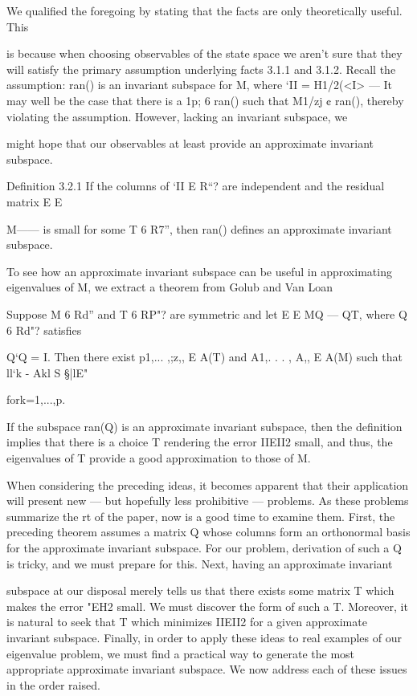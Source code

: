 We qualiﬁed the foregoing by stating that the facts are only theoretically useful. This

is because when choosing observables of the state space we aren't sure that they will satisfy the
primary assumption underlying facts 3.1.1 and 3.1.2. Recall the assumption: ran(\II) is an invariant
subspace for M, where ‘II = H1/2(<I> —  It may well be the case that there is a 1p; 6 ran(\II) such
that M1/zj ¢ ran(\II), thereby violating the assumption. However, lacking an invariant subspace, we

might hope that our observables at least provide an approximate invariant subspace.

Deﬁnition 3.2.1 If the columns of ‘II E R“? are independent and the residual matrix E E

M\II —— \IIT is small for some T 6 R7”, then ran(\II) deﬁnes an approximate invariant subspace.

To see how an approximate invariant subspace can be useful in approximating eigenvalues of M,
we extract a theorem from Golub and Van Loan 
\begin{theorem}
\label{thm-3.2.1}  
Suppose M 6 Rd” and T 6 RP"? are symmetric and let E E MQ — QT, where Q 6 Rd"? satisﬁes

Q‘Q = I. Then there exist p1,... ,;z,, E A(T) and A1,. . . , A,, E A(M) such that
ll‘k - Akl S \/§|lE"

fork=1,...,p.
\end{theorem}

If the subspace ran(Q) is an approximate invariant subspace, then the deﬁnition implies that
there is a choice T rendering the error IIEII2 small, and thus, the eigenvalues of T provide a good
approximation to those of M.

When considering the preceding ideas, it becomes apparent that their application will
present new — but hopefully less prohibitive — problems. As these problems summarize the rt of
the paper, now is a good time to examine them. First, the preceding theorem assumes a matrix Q
whose columns form an orthonormal basis for the approximate invariant subspace. For our problem,
derivation of such a Q is tricky, and we must prepare for this. Next, having an approximate invariant

subspace at our disposal merely tells us that there exists some matrix T which makes the error
"EH2 small. We must discover the form of such a T. Moreover, it is natural to seek that T which
minimizes IIEII2 for a given approximate invariant subspace. Finally, in order to apply these ideas
to real examples of our eigenvalue problem, we must ﬁnd a practical way to generate the most
appropriate approximate invariant subspace. We now address each of these issues in the order
raised.

